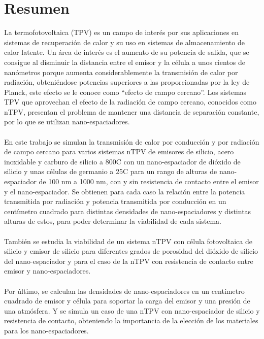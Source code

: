 \chapter{Resumen}

La termofotovoltaica (TPV) es un campo de interés por sus aplicaciones en sistemas de recuperación de calor y su uso en sistemas de almacenamiento de calor latente. Un área de interés es el aumento de su potencia de salida, que se consigue al disminuir la distancia entre el emisor y la célula a unos cientos de nanómetros porque aumenta considerablemente la transmisión de calor por radiación, obteniéndose potencias superiores a las proporcionadas por la ley de Planck, este efecto se le conoce como ``efecto de campo cercano''. Los sistemas TPV que aprovechan el efecto de la radiación de campo cercano, conocidos como nTPV, presentan el problema de mantener una distancia de separación constante, por lo que se utilizan nano-espaciadores.\\\\
En este trabajo se simulan la transmisión de calor por conducción y por radiación de campo cercano para varios sistemas nTPV de emisores de silicio, acero inoxidable y carburo de silicio a 800\textdegree C con un nano-espaciador de dióxido de silicio y unas células de germanio a 25\textdegree C para un rango de alturas de nano-espaciador de 100 nm a 1000 nm, con y sin resistencia de contacto entre el emisor y el nano-espaciador. Se obtienen para cada caso la relación entre la potencia transmitida por radiación y potencia transmitida por conducción en un centímetro cuadrado para distintas densidades de nano-espaciadores y distintas alturas de estos, para poder determinar la viabilidad de cada sistema.\\\\
También se estudia la viabilidad de un sistema nTPV con célula fotovoltaica de silicio y emisor de silicio para diferentes grados de porosidad del dióxido de silicio del nano-espaciador y para el caso de la nTPV con resistencia de contacto entre emisor y nano-espaciadores.\\\\
Por último, se calculan las densidades de nano-espaciadores en un centímetro cuadrado de emisor y célula para soportar la carga del emisor y una presión de una atmósfera. Y se simula un caso de una nTPV con nano-espaciador de silicio y resistencia de contacto, obteniendo la importancia de la elección de los materiales para los nano-espaciadores.

